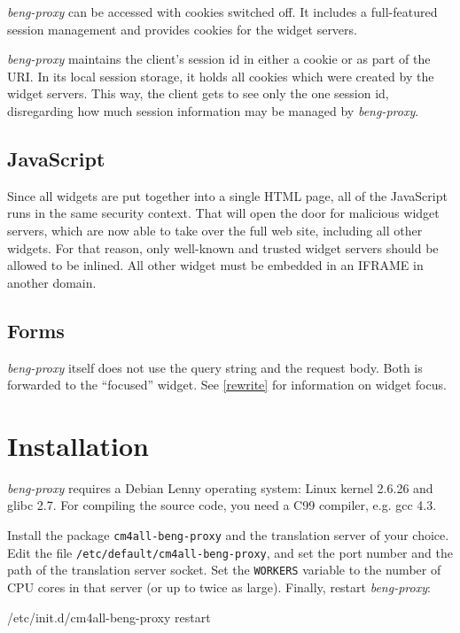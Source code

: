 \documentclass[a4paper,12pt]{article}
\begin{document}
\emph{beng-proxy} can be accessed with cookies switched off.  It includes a
full-featured session management and provides cookies for the widget
servers.

\emph{beng-proxy} maintains the client's session id in either a cookie
or as part of the URI.  In its local session storage, it holds all
cookies which were created by the widget servers.  This way, the
client gets to see only the one session id, disregarding how much
session information may be managed by \emph{beng-proxy}.


\subsection{JavaScript}

Since all widgets are put together into a single HTML page, all of the
JavaScript runs in the same security context.  That will open the door
for malicious widget servers, which are now able to take over the full
web site, including all other widgets.  For that reason, only
well-known and trusted widget servers should be allowed to be inlined.
All other widget must be embedded in an IFRAME in another domain.


\subsection{Forms}

\emph{beng-proxy} itself does not use the query string and the request
body.  Both is forwarded to the ``focused'' widget.  See \ref{rewrite}
for information on widget focus.


\section{Installation}

\emph{beng-proxy} requires a Debian Lenny operating system: Linux
kernel 2.6.26 and glibc 2.7.  For compiling the source code, you need
a C99 compiler, e.g. gcc 4.3.

Install the package \texttt{cm4all-beng-proxy} and the translation
server of your choice.  Edit the file
\texttt{/etc/default/cm4all-beng-proxy}, and set the port number and
the path of the translation server socket.  Set the \texttt{WORKERS}
variable to the number of CPU cores in that server (or up to twice as
large).  Finally, restart \emph{beng-proxy}:

\begin{verbatim*}
/etc/init.d/cm4all-beng-proxy restart
\end{verbatim*}
\end{document}

